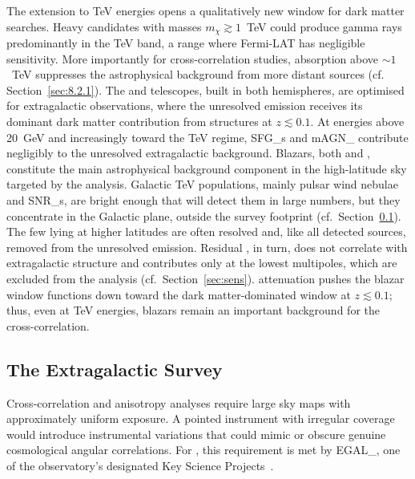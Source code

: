The extension to TeV energies opens a qualitatively new window for dark matter searches.
Heavy \WIMP candidates with masses $m_\chi \gtrsim 1$~TeV could produce gamma rays predominantly in the TeV band, a range where Fermi-LAT has negligible sensitivity.
More importantly for cross-correlation studies, \EBL absorption above $\sim 1$~TeV suppresses the astrophysical background from more distant sources (cf. Section~\ref{sec:8.2.1}).
The \LST and \MST telescopes, built in both hemispheres, are optimised for extragalactic observations, where the unresolved emission receives its dominant dark matter contribution from structures at $z \lesssim 0.1$.
At energies above 20~GeV and increasingly toward the TeV regime, \glspl{SFG_} and \gls{mAGN_} contribute negligibly to the unresolved extragalactic background. Blazars, both \HSP and \LISP, constitute the main astrophysical background component in the high-latitude sky targeted by the analysis.
Galactic TeV populations, mainly pulsar wind nebulae and \glspl{SNR_}, are bright enough that \CTAO will detect them in large numbers, but they concentrate in the Galactic plane, outside the survey footprint (cf.\ Section~\ref{sec:8.3.2}). The few lying at higher latitudes are often resolved and, like all detected sources, removed from the unresolved emission. Residual \GDE, in turn, does not correlate with extragalactic structure and contributes only at the lowest multipoles, which are excluded from the analysis (cf.\ Section~\ref{sec:sens}).
\EBL attenuation pushes the blazar window functions down toward the dark matter-dominated window at $z \lesssim 0.1$; thus, even at TeV energies, blazars remain an important background for the cross-correlation.

\subsection{The Extragalactic Survey}
\label{sec:8.3.2}

Cross-correlation and anisotropy analyses require large sky maps with approximately uniform exposure.
A pointed instrument with irregular coverage would introduce instrumental variations that could mimic or obscure genuine cosmological angular correlations.
For \CTAO, this requirement is met by \gls{EGAL_}, one of the observatory's designated Key Science Projects~\cite{CTAConsortium:2017dvg}.

